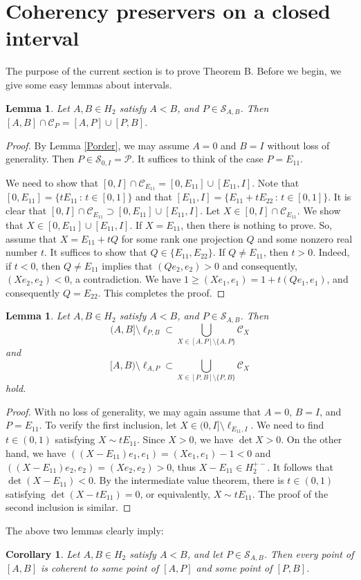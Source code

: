 \documentclass[10pt]{amsart}
\newtheorem{lemma}[theorem]{Lemma}
\newtheorem{corollary}[theorem]{Corollary}
\theoremstyle{definition}
\theoremstyle{remark}
\numberwithin{subsection}{section}
\numberwithin{equation}{section}
\newcommand\cC{{\mathcal{C}}}
\begin{document}


\section{Coherency preservers on a closed interval}\label{ci}
The purpose of the current section is to prove Theorem B. 
Before we begin, we give some easy lemmas about intervals. 
\begin{lemma}\label{dupc}
Let $A, B\in H_2$ satisfy $A<B$, and $P\in \mathcal{S}_{A,B}$. 
Then $[A, B]\cap \cC_P =[A, P]\cup [P, B]$.
\end{lemma}
\begin{proof}
By Lemma \ref{Porder}, we may assume $A=0$ and $B=I$ without loss of generality. 
Then $P\in \mathcal{S}_{0,I} =\mathcal{P}$. 
It suffices to think of the case $P=E_{11}$. 

We need to show that $[0, I]\cap \cC_{E_{11}} =[0, E_{11}]\cup [E_{11}, I]$.
Note that $[0, E_{11}] =\{tE_{11}\,:\, t\in [0,1]\}$ and that $[E_{11}, I] =\{E_{11}+tE_{22}\,:\, t\in [0,1]\}$. 
It is clear that $[0, I]\cap \cC_{E_{11}} \supset[0, E_{11}]\cup [E_{11}, I]$.
Let $X\in [0, I]\cap \cC_{E_{11}}$. 
We show that $X\in [0, E_{11}]\cup [E_{11}, I]$.
If $X=E_{11}$, then there is nothing to prove.
So, assume that $X = E_{11} + tQ$ for some rank one projection $Q$ and some nonzero real number $t$. It suffices to show that $Q\in \{E_{11}, E_{22}\}$. If $Q \not = E_{11}$, then $t >0$. Indeed, if $t < 0$, then $Q \not = E_{11}$ implies that $(Qe_2 , e_2) > 0$ and consequently, $(Xe_2 , e_2) <0$, a contradiction. We have $1 \ge (Xe_1 , e_1) = 1 + t(Qe_1, e_1)$, and consequently $Q=E_{22}$. This completes the proof.
\end{proof}

\begin{lemma}\label{0XI}
Let $A, B\in H_2$ satisfy $A<B$, and $P\in \mathcal{S}_{A,B}$. 
Then 
\begin{equation}\label{mmnn}
(A, B]\setminus \ell_{P, B}\subset \bigcup_{X\in [A, P]\setminus\{A, P\}} \cC_X
\end{equation}
 and 
\[
[A, B)\setminus \ell_{A, P}\subset \bigcup_{X\in [P, B]\setminus\{P, B\}} \cC_X
\]
hold.
\end{lemma}
\begin{proof}
With no loss of generality, we may again assume that $A= 0$, $B=I$, and $P=E_{11}$. 
To verify the first inclusion, let $X\in (0, I]\setminus \ell_{E_{11}, I}$.
We need to find $t\in (0,1)$ satisfying $X\sim tE_{11}$.
Since $X>0$, we have $\det X >0$.
On the other hand, we have $((X-E_{11})e_1, e_1)= (Xe_1,e_1)-1<0$ and $((X-E_{11})e_2, e_2)=(Xe_2, e_2)>0$, thus $X-E_{11}\in H_2^{+-}$. It follows that $\det (X-E_{11}) <0$. 
By the intermediate value theorem, there is $t\in (0,1)$ satisfying $\det (X- tE_{11})=0$, or equivalently, $X\sim tE_{11}$.
The proof of the second inclusion is similar.
\end{proof}
The above two lemmas clearly imply:
\begin{corollary}\label{JeDr}
Let $A, B\in H_2$ satisfy $A<B$, and let $P\in \mathcal{S}_{A, B}$. 
Then every point of $[A, B]$ is coherent to some point of $[A, P]$ and some point of $[P, B]$. 
\end{corollary}
\end{document}
